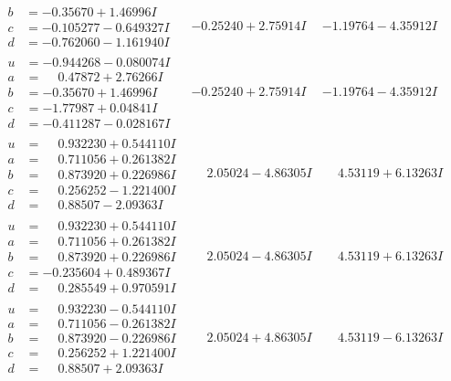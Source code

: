 \documentclass[1p]{elsarticle_modified}
\theoremstyle{definition}
\begin{document}
$$\begin{array}{c|c|c}
\begin{aligned}
b &= -0.35670 + 1.46996 I \\
c &= -0.105277 - 0.649327 I \\
d &= -0.762060 - 1.161940 I\end{aligned}
 & -0.25240 + 2.75914 I & -1.19764 - 4.35912 I \\ \hline\begin{aligned}
u &= -0.944268 - 0.080074 I \\
a &= \phantom{-}0.47872 + 2.76266 I \\
b &= -0.35670 + 1.46996 I \\
c &= -1.77987 + 0.04841 I \\
d &= -0.411287 - 0.028167 I\end{aligned}
 & -0.25240 + 2.75914 I & -1.19764 - 4.35912 I \\ \hline\begin{aligned}
u &= \phantom{-}0.932230 + 0.544110 I \\
a &= \phantom{-}0.711056 + 0.261382 I \\
b &= \phantom{-}0.873920 + 0.226986 I \\
c &= \phantom{-}0.256252 - 1.221400 I \\
d &= \phantom{-}0.88507 - 2.09363 I\end{aligned}
 & \phantom{-}2.05024 - 4.86305 I & \phantom{-}4.53119 + 6.13263 I \\ \hline\begin{aligned}
u &= \phantom{-}0.932230 + 0.544110 I \\
a &= \phantom{-}0.711056 + 0.261382 I \\
b &= \phantom{-}0.873920 + 0.226986 I \\
c &= -0.235604 + 0.489367 I \\
d &= \phantom{-}0.285549 + 0.970591 I\end{aligned}
 & \phantom{-}2.05024 - 4.86305 I & \phantom{-}4.53119 + 6.13263 I \\ \hline\begin{aligned}
u &= \phantom{-}0.932230 - 0.544110 I \\
a &= \phantom{-}0.711056 - 0.261382 I \\
b &= \phantom{-}0.873920 - 0.226986 I \\
c &= \phantom{-}0.256252 + 1.221400 I \\
d &= \phantom{-}0.88507 + 2.09363 I\end{aligned}
 & \phantom{-}2.05024 + 4.86305 I & \phantom{-}4.53119 - 6.13263 I \\ \hline\begin{aligned}

\end{aligned}
\end{array}$$
\end{document}
